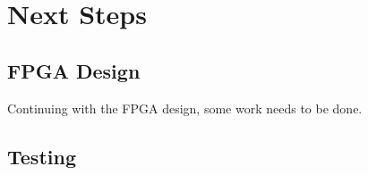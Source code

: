 \chapter{Next Steps}\label{C:nextSteps}

\section{FPGA Design}

Continuing with the FPGA design, some work needs to be done. 

\section{Testing}
